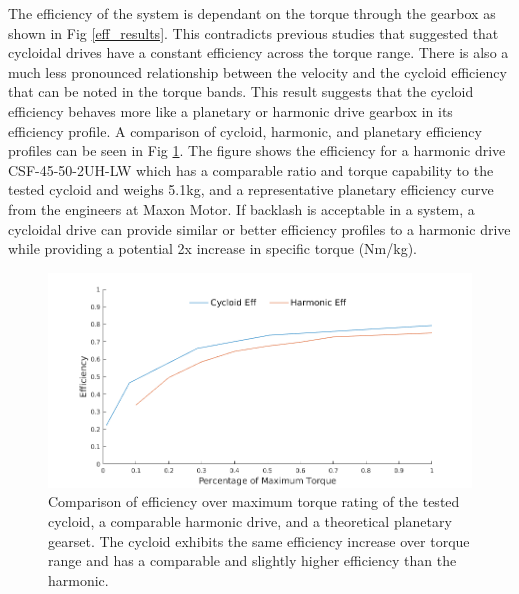 The efficiency of the system is dependant on the torque through the gearbox as shown in Fig \ref{eff_results}.
This contradicts previous studies that suggested that cycloidal drives have a constant efficiency across the torque range.
There is also a much less pronounced relationship between the velocity and the cycloid efficiency that can be noted in the torque bands.
This result suggests that the cycloid efficiency behaves more like a planetary or harmonic drive gearbox in its efficiency profile.
A comparison of cycloid, harmonic, and planetary efficiency profiles can be seen in Fig \ref{eff_comp}.
The figure shows the efficiency for a harmonic drive CSF-45-50-2UH-LW \cite{ref:harmonic_sheet} which has a comparable ratio and torque capability to the tested cycloid and weighs 5.1kg, and a representative planetary efficiency curve from the engineers at Maxon Motor.
If backlash is acceptable in a system, a cycloidal drive can provide similar or better efficiency profiles to a harmonic drive while providing a potential 2x increase in specific torque (Nm/kg).

\begin{figure}[t]
   \centering
   \includegraphics[width=\linewidth]{fig/eff_comp_v3}
   \caption{Comparison of efficiency over maximum torque rating of the tested cycloid, a comparable harmonic drive, and a theoretical planetary gearset.
   The cycloid exhibits the same efficiency increase over torque range and has a comparable and slightly higher efficiency than the harmonic.}
   \label{eff_comp}
\end{figure}

